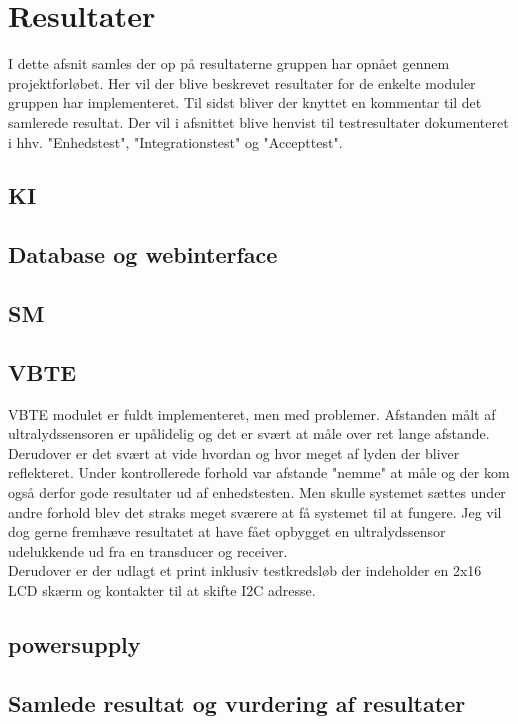 \section{Resultater}
I dette afsnit samles der op på resultaterne gruppen har opnået gennem projektforløbet. Her vil der blive beskrevet resultater for de enkelte moduler gruppen har implementeret. Til sidst bliver der knyttet en kommentar til det samlerede resultat. Der vil i afsnittet blive henvist til testresultater dokumenteret i hhv. "Enhedstest", "Integrationstest" og "Accepttest".

\subsection{KI}

\subsection{Database og webinterface}

\subsection{SM}

\subsection{VBTE}
VBTE modulet er fuldt implementeret, men med problemer. Afstanden målt af ultralydssensoren er upålidelig og det er svært at måle over ret lange afstande. Derudover er det svært at vide hvordan og hvor meget af lyden der bliver reflekteret. Under kontrollerede forhold var afstande "nemme" at måle og der kom også derfor gode resultater ud af enhedstesten. Men skulle systemet sættes under andre forhold blev det straks meget sværere at få systemet til at fungere. Jeg vil dog gerne fremhæve resultatet at have fået opbygget en ultralydssensor udelukkende ud fra en transducer og receiver.\\ Derudover er der udlagt et print inklusiv testkredsløb der indeholder en 2x16 LCD skærm og kontakter til at skifte I2C adresse.

\subsection{powersupply}

\subsection{Samlede resultat og vurdering af resultater}
